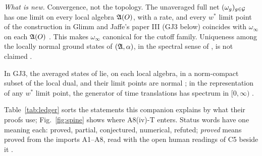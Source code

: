 \emph{What is new.}
Convergence, not the topology. The unaveraged full net $(\omega_g)_{g\in\mathcal{G}}$ has one limit
on every local algebra $\mathfrak{A}(O)$, with a rate, and every $w^*$ limit point of the
construction in Glimm and Jaffe's paper III \cite{GJ3} (GJ3 below) coincides with
$\omega_\infty$ on each $\mathfrak{A}(O)$ . This makes $\omega_\infty$
canonical for the cutoff family. Uniqueness among the locally normal ground states of
$(\mathfrak{A},\alpha)$, in the spectral sense of , is not claimed
.

\begin{context}
In GJ3, the averaged states of \cite[(2.4)]{GJ3} lie, on each local algebra, in a
norm-compact subset of the local dual, and their limit points are normal
\cite[Thm.~2.3, p.~211]{GJ3}; in the representation of any $w^*$ limit point, the
generator of time translations has spectrum in $[0,\infty)$ \cite[Thm.~2.1, p.~211]{GJ3}.
\end{context}

Table~\ref{tab:ledger} sorts the statements this companion explains by what their proofs
use; Fig.~\ref{fig:spine} shows where A8(iv)-T enters. Status words have one meaning each:
proved, partial, conjectured, numerical, refuted; \emph{proved} means proved from the
imports A1--A8, read with the open human readings of C5 beside it .

